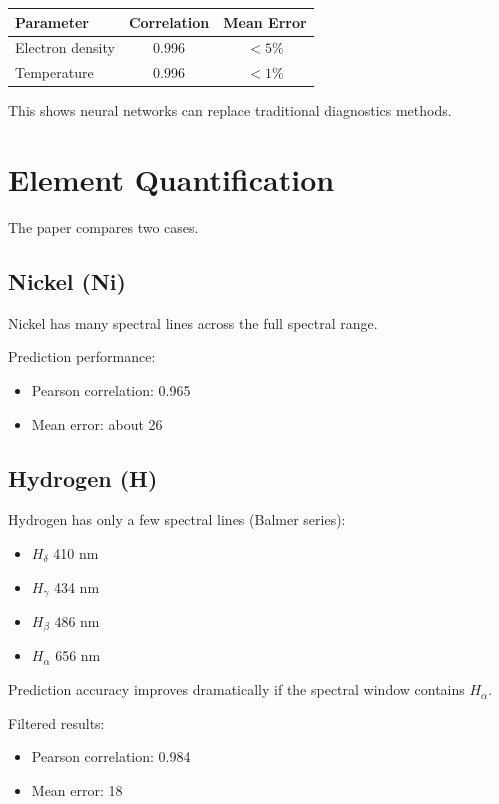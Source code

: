 \documentclass[12pt]{article}
\begin{document}
\begin{center}
\begin{tabular}{lcc}
\toprule
Parameter & Correlation & Mean Error \\
\midrule
Electron density & 0.996 & $<5\%$ \\
Temperature & 0.996 & $<1\%$ \\
\bottomrule
\end{tabular}
\end{center}

This shows neural networks can replace traditional diagnostics methods.

\section{Element Quantification}
The paper compares two cases.

\subsection{Nickel (Ni)}
Nickel has many spectral lines across the full spectral range.

Prediction performance:

\begin{itemize}
\item Pearson correlation: 0.965
\item Mean error: about 26%
\end{itemize}

\subsection{Hydrogen (H)}
Hydrogen has only a few spectral lines (Balmer series):

\begin{itemize}
\item $H_\delta$ 410 nm
\item $H_\gamma$ 434 nm
\item $H_\beta$ 486 nm
\item $H_\alpha$ 656 nm
\end{itemize}

Prediction accuracy improves dramatically if the spectral window contains $H_\alpha$.

Filtered results:

\begin{itemize}
\item Pearson correlation: 0.984
\item Mean error: 18%
\end{itemize}
\end{document}
